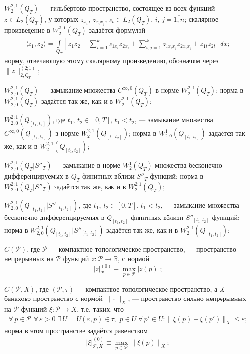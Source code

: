 \documentclass{report}
\begin{document}
$W^{2;1}_2(Q_T)$ --- гильбертово пространство, состоящее из всех функций $z\in L_2(Q_T)$, у которых $z_{x_i}$, $z_{x_ix_j}$, $z_t\in
L_2(Q_T)$, $i,\,j=\overline{1,n}$; скалярное произведение в $W^{2;1}_2(Q_T)$ задаётся формулой
\begin{gather*}
\langle z_1,z_2\rangle=
\int\limits_{Q_T}\left[z_1z_2+\sum\limits_{i=1}^kz_{1x_i}z_{2x_i}+\sum\limits_{i,j=1}^kz_{1x_ix_j}z_{2x_ix_j}+
z_{1t}z_{2t}\right]dx;
\end{gather*}
норму, отвечающую этому скалярному произведению, обозначим через $\|z\|^{(2;1)}_{2,Q_T}$;



$W^{2;1}_{2,0}(Q_T)$ --- замыкание множества $C^{\infty,0}(Q_T)$ в норме $W^{2;1}_2(Q_T)$; норма в $W^{2;1}_{2,0}(Q_T)$ задаётся так же, как и в $W^{2;1}_2(Q_T)$;

$W^{2;1}_{2,0}(Q_{[t_1,t_2]})$, где $t_1$, $t_2\in[0,T]$, $t_1< t_2$, --- замыкание множества $C^{\infty,0}(Q_{[t_1,t_2]})$ в
норме $W^{2;1}_2(Q_{[t_1,t_2]})$; норма в $W^1_{2,0}(Q_{[t_1,t_2]})$ задаётся так же, как и в $W^{2;1}_2(Q_{[t_1,t_2]})$;



$W^{2;1}_{2,0}(Q_T|S''_T)$ --- замыкание в норме $W^1_2(Q_T)$ множества бесконечно дифференцируемых в $Q_T$ финитных вблизи $S''_T$ функций;
норма в $W^{2;1}_{2,0}(Q_T|S''_T)$ задаётся так же, как и в $W^{2;1}_2(Q_T)$;

$W^{2;1}_{2,0}(Q_{[t_1,t_2]}|S''_{[t_1,t_2]})$, где $t_1$, $t_2\in[0,T]$, $t_1< t_2$, --- замыкание множества  бесконечно дифференцируемых
в $Q_{[t_1,t_2]}$ финитных вблизи $S''_{[t_1,t_2]}$ функций; норма в $W^{2;1}_{2,0}(Q_{[t_1,t_2]}|S''_{[t_1,t_2]})$ задаётся так же, как и
в $W^{2;1}_2(Q_{[t_1,t_2]})$;


$C(\mathcal{P})$, где $\mathcal{P}$ --- компактное топологическое пространство, --- пространство непрерывных на $\mathcal{P}$ функций $z\colon\mathcal{P}\to \mathbb{R}$, с нормой
$$
\pmb{|}z\pmb{|}^{(0)}_{\mathcal{P}}\equiv\max\limits_{p\in\mathcal{P}}|z(p)|;
$$

$C(\mathcal{P},X)$, где $(\mathcal{P},\tau)$ --- компактное топологическое пространство, а  $X$ --- банахово пространство с нормой $\|\cdot\|_X$, --- пространство сильно непрерывных на
$\mathcal{P}$ функций $\xi\colon\mathcal{P}\to X$, т.е. таких, что
\begin{gather*}
\forall\,p\in\mathcal{P}\,\,\forall\,\varepsilon>0\,\,\exists\,U=U(\varepsilon,p)\in\tau,\,\,p\in U\,\,\forall\,p'\in U:
\|\xi(p)-\xi(p')\|_X\leqslant\varepsilon;
\end{gather*}
норма в этом пространстве задаётся равенством
\begin{gather*}
\pmb{|}\xi\pmb{|}^{(0)}_{\mathcal{P},X}\equiv\max\limits_{p\in\mathcal{P}}\|\xi(p)\|_X;
\end{gather*}
\end{document}
